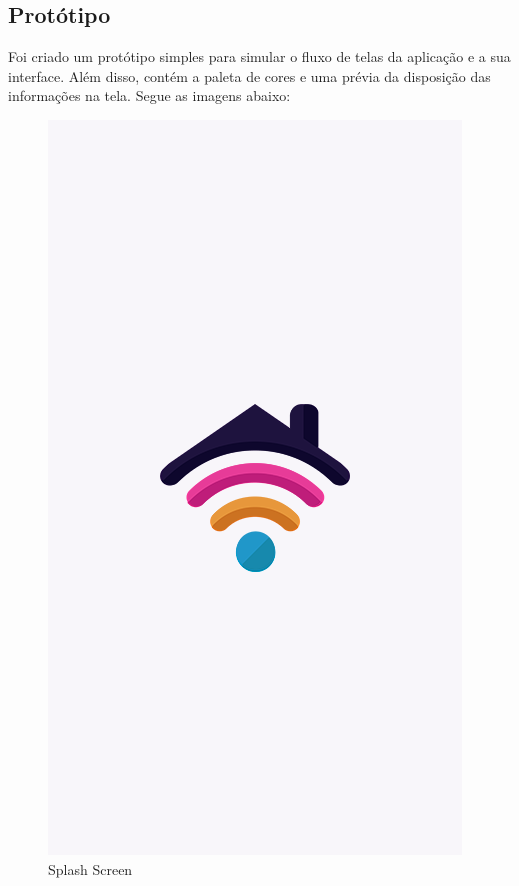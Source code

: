  	        \subsection{Protótipo}
 	            \par Foi criado um protótipo simples para simular o fluxo de telas da aplicação e a sua interface. Além disso, contém a paleta de cores e uma prévia da disposição das informações na tela. Segue as imagens abaixo:
                \graphicspath{ {figuras/} }
                \begin{figure}[h]
                    \centering
                    \includegraphics[scale=0.35]{1}
                    \caption{Splash Screen}
                    \label{fig:splash}
                \end{figure}
                
